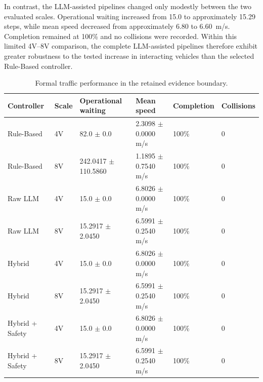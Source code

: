 \documentclass[letterpaper,10pt,conference]{ieeeconf}
\begin{document}
In contrast, the LLM-assisted pipelines changed only modestly between the two evaluated scales. Operational waiting increased from 15.0 to approximately 15.29 steps, while mean speed decreased from approximately 6.80 to 6.60~m/s. Completion remained at 100\% and no collisions were recorded. Within this limited 4V--8V comparison, the complete LLM-assisted pipelines therefore exhibit greater robustness to the tested increase in interacting vehicles than the selected Rule-Based controller.



\begin{table}[t]

\centering

\caption{Formal traffic performance in the retained evidence boundary.}

\label{tab:formal_traffic}

\renewcommand{\arraystretch}{1.1}

\begin{tabular}{p{2.75cm} p{0.9cm} p{2.25cm} p{2.05cm} p{1.35cm} p{1.15cm}}

\toprule

\textbf{Controller} & \textbf{Scale} & \textbf{Operational waiting} & \textbf{Mean speed} & \textbf{Completion} & \textbf{Collisions} \\

\midrule

Rule-Based & 4V & 82.0 $\pm$ 0.0 & 2.3098 $\pm$ 0.0000 m/s & 100\% & 0 \\

Rule-Based & 8V & 242.0417 $\pm$ 110.5860 & 1.1895 $\pm$ 0.7540 m/s & 100\% & 0 \\

Raw LLM & 4V & 15.0 $\pm$ 0.0 & 6.8026 $\pm$ 0.0000 m/s & 100\% & 0 \\

Raw LLM & 8V & 15.2917 $\pm$ 2.0450 & 6.5991 $\pm$ 0.2540 m/s & 100\% & 0 \\

Hybrid & 4V & 15.0 $\pm$ 0.0 & 6.8026 $\pm$ 0.0000 m/s & 100\% & 0 \\

Hybrid & 8V & 15.2917 $\pm$ 2.0450 & 6.5991 $\pm$ 0.2540 m/s & 100\% & 0 \\

Hybrid + Safety & 4V & 15.0 $\pm$ 0.0 & 6.8026 $\pm$ 0.0000 m/s & 100\% & 0 \\

Hybrid + Safety & 8V & 15.2917 $\pm$ 2.0450 & 6.5991 $\pm$ 0.2540 m/s & 100\% & 0 \\

\bottomrule

\end{tabular}

\end{table}
\end{document}

